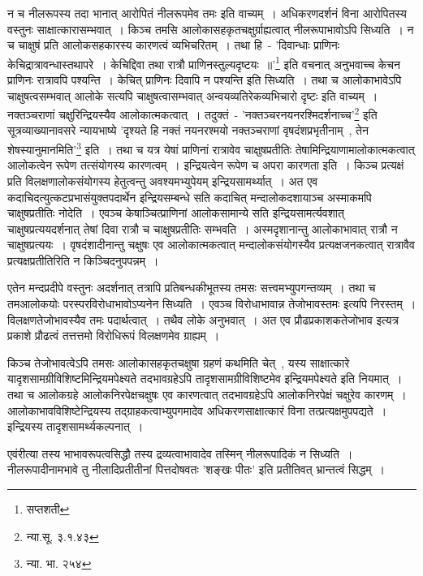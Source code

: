 		न च नीलरूपस्य तदा भानात् आरोपितं नीलरूपमेव तमः इति वाच्यम्~। अधिकरणदर्शनं विना आरोपितस्य वस्तुनः साक्षात्कारासम्भवात्~। किञ्च तमसि आलोकासहकृतचक्षुर्ग्राह्यत्वात् नीलरूपाभावोऽपि सिध्यति~। न च चाक्षुषं प्रति आलोकसहकारस्य कारणत्वं व्यभिचरितम्~। तथा हि~- {\fontsize{11.7}{0}\selectfont\s 'दिवान्धाः प्राणिनः केचिद्रात्रावन्धास्तथापरे~। केचिद्दिवा तथा रात्रौ प्राणिनस्तुल्यदृष्टयः~॥'\footnote{सप्तशती}} इति वचनात् अनुभवाच्च केचन प्राणिनः रात्रावपि पश्यन्ति~। केचित् प्राणिनः दिवापि न पश्यन्ति इति सिध्यति~। तथा च आलोकाभावेऽपि चाक्षुषत्वसम्भवात् आलोके सत्यपि चाक्षुषत्वासम्भवात् अन्वयव्यतिरेकव्यभिचारो दृष्टः इति वाच्यम्~। नक्तञ्चराणां चक्षुरिन्द्रियस्यैव आलोकात्मकत्वात्~। तदुक्तं~- 'नक्तञ्चरनयनरश्मिदर्शनाच्च'\footnote{न्या.सू. ३.१.४३} इति सूत्रव्याख्यानावसरे न्यायभाष्ये {\fontsize{11.7}{0}\selectfont\s 'दृश्यते हि नक्तं नयनरश्मयो नक्तञ्चराणां वृषदंशप्रभृतीनाम्~, तेन शेषस्यानुमानमिति'\footnote{न्या. भा. २५४}} इति~। तथा च यत्र येषां प्राणिनां रात्रावेव चाक्षुषप्रतीतिः तेषामिन्द्रियाणामालोकात्मकत्वात् आलोकत्वेन रूपेण तत्संयोगस्य कारणत्वम्~। इन्द्रियत्वेन रूपेण च अपरा कारणता इति~। किञ्च प्रत्यक्षं प्रति विलक्षणालोकसंयोगस्य हेतुत्वन्तु अवश्यमभ्युपेयम् इन्द्रियसामर्थ्यात्~। अत एव कदाचिदत्युत्कटप्रभासंयुक्तपदार्थेन इन्द्रियसम्बन्धे सति कदाचित् मन्दालोकदशायाञ्च अस्माकमपि चाक्षुषप्रतीतिः नोदेति~। एवञ्च केषाञ्चित्प्राणिनां आलोकसामान्ये सति इन्द्रियसामर्त्यवशात् चाक्षुषप्रत्ययदर्शनात् तेषां दिवा रात्रौ च चाक्षुषप्रतीतिः सम्भवति~। अस्मदृशानान्तु आलोकाभावात् रात्रौ न चाक्षुषप्रत्ययः~। वृषदंशादीनान्तु चक्षुषः एव आलोकात्मकत्वात् मन्दालोकसंयोगस्यैव प्रत्यक्षजनकत्वात् रात्रावैव प्रत्यक्षप्रतीतिरिति न किञ्चिदनुपपन्नम्~। 

		एतेन मन्दप्रदीपे वस्तुनः अदर्शनात् तत्रापि प्रतिबन्धकीभूतस्य तमसः सत्त्वमभ्युपगन्तव्यम्~। तथा च तमआलोकयोः परस्परविरोधाभावोऽप्यनेन सिध्यति~। एवञ्च विरोधाभावान्न तेजोभावस्तमः इत्यपि निरस्तम्~। विलक्षणतेजोभावस्यैव तमः पदार्थत्वात्~। तथैव लोके अनुभवात्~। अत एव प्रौढप्रकाशकतेजोभाव इत्यत्र प्रकाशे प्रौढत्वं तत्तत्तमो विरोधिरूपं विलक्षणमेव ग्राह्यम्~।

		किञ्च तेजोभावत्वेऽपि तमसः आलोकासहकृतचक्षुषा ग्रहणं कथमिति चेत्~, यस्य साक्षात्कारे यादृशसामग्रीविशिष्टमिन्द्रियमपेक्ष्यते तदभावग्रहेऽपि तादृशसामग्रीविशिष्टमेव इन्द्रियमपेक्ष्यते इति नियमात्~। तथा च आलोकग्रहे आलोकनिरपेक्षचक्षुषः एव कारणत्वात् तदभावग्रहेऽपि आलोकनिरपेक्षं चक्षुरेव कारणम्~। आलोकाभावविशिष्टेन्द्रियस्य तद्ग्राहकत्वाभ्युपगमादेव अधिकरणसाक्षात्कारं विना तत्प्रत्यक्षमुपपद्यते~। इन्द्रियस्य तादृशसामर्थ्यकल्पनात्~।

		एवंरीत्या तस्य भाभावरूपत्वसिद्धौ तस्य द्रव्यत्वाभावादेव तस्मिन् नीलरूपादिकं न सिध्यति~। नीलरूपादीनामभावे तु नीलादिप्रतीतीनां पित्तदोषवतः 'शङ्खः पीतः' इति प्रतीतिवत् भ्रान्तत्वं सिद्धम्~।



